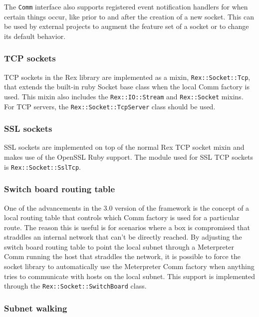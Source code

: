 \documentclass{report}
\begin{document}
\par
The \texttt{Comm} interface also supports registered event
notification handlers for when certain things occur, like prior to
and after the creation of a new socket.  This can be used by
external projects to augment the feature set of a socket or to
change its default behavior.

            \subsubsection{TCP sockets}

\par
TCP sockets in the Rex library are implemented as a mixin,
\texttt{Rex::Socket::Tcp}, that extends the built-in ruby Socket
base class when the local Comm factory is used.  This mixin also
includes the \texttt{Rex::IO::Stream} and \texttt{Rex::Socket}
mixins.  For TCP servers, the \texttt{Rex::Socket::TcpServer} class
should be used.

            \subsubsection{SSL sockets}

\par
SSL sockets are implemented on top of the normal Rex TCP socket
mixin and makes use of the OpenSSL Ruby support.  The module used
for SSL TCP sockets is \texttt{Rex::Socket::SslTcp}.

            \subsubsection{Switch board routing table}

\par
One of the advancements in the 3.0 version of the framework is the
concept of a local routing table that controls which Comm factory is
used for a particular route.  The reason this is useful is for
scenarios where a box is compromised that straddles an internal
network that can't be directly reached.  By adjusting the switch
board routing table to point the local subnet through a Meterpreter
Comm running the host that straddles the network, it is possible to
force the socket library to automatically use the Meterpreter Comm
factory when anything tries to communicate with hosts on the local
subnet.  This support is implemented through the
\texttt{Rex::Socket::SwitchBoard} class.

            \subsubsection{Subnet walking}
\end{document}
